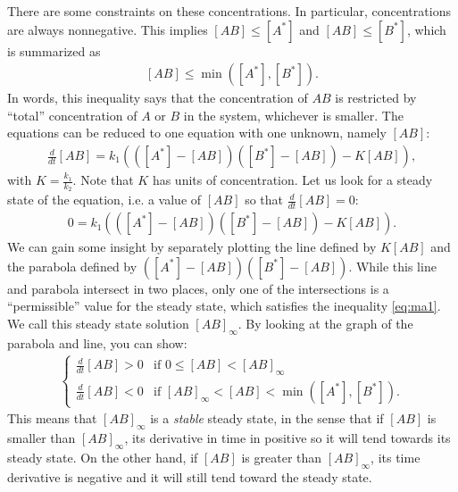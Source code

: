 \documentclass[10pt]{article}
\begin{document}
There are some constraints on these concentrations.  In particular, concentrations are always nonnegative.  This implies $[AB] \leq [A^*]$ and $[AB] \leq [B^*]$, which is summarized as 
\begin{align}
\label{eq:ma1}
[AB] \leq \min([A^*],[B^*]).
\end{align}
In words, this inequality says that the concentration of $AB$ is restricted by ``total'' concentration of $A$ or $B$ in the system, whichever is smaller.  The equations can be reduced to one equation with one unknown, namely $[AB]$:
\begin{align}
\label{eq:ma2}
\frac{d}{dt}[AB] = k_1 \left( ([A^*] - [AB])([B^*] - [AB]) - K[AB] \right),
\end{align}
with $K = \frac{k_1}{k_2}$.  Note that $K$ has units of concentration.  Let us look for a steady state of the equation, i.e. a value of $[AB]$ so that $\frac{d}{dt}[AB] = 0$:
\begin{align*}
0 = k_1 \left( ([A^*] - [AB])([B^*] - [AB]) - K[AB] \right).
\end{align*}
We can gain some insight by separately plotting the line defined by $K[AB]$ and the parabola defined by $([A^*] - [AB])([B^*] - [AB])$.  While this line and parabola intersect in two places, only one of the intersections is a ``permissible'' value for the steady state, which satisfies the inequality \eqref{eq:ma1}.  We call this steady state solution $[AB]_\infty$.  By looking at the graph of the parabola and line, you can show:
\begin{align*}
\begin{cases}
\frac{d}{dt}[AB] > 0 & \text{if } 0 \leq [AB] < [AB]_\infty \\
\frac{d}{dt}[AB] < 0 & \text{if } [AB]_\infty < [AB] < \min([A^*],[B^*]).
\end{cases}
\end{align*}
This means that $[AB]_\infty$ is a {\em stable} steady state, in the sense that if $[AB]$ is smaller than $[AB]_\infty$, its derivative in time in positive so it will tend towards its steady state.  On the other hand, if $[AB]$ is greater than $[AB]_\infty$, its time derivative is negative and it will still tend toward the steady state. 
\end{document}
